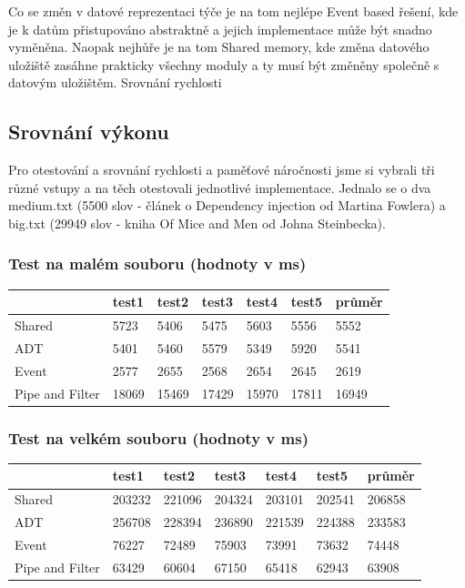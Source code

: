 \documentclass[11pt]{article}
\begin{document}
Co se změn v datové reprezentaci týče je na tom nejlépe Event based řešení, kde je k datům přistupováno abstraktně a jejich implementace může být snadno vyměněna. Naopak nejhůře je na tom  Shared memory, kde změna datového uložiště zasáhne prakticky všechny moduly a ty musí být změněny společně s datovým uložištěm.
Srovnání rychlosti

\subsection{Srovnání výkonu}

Pro otestování a srovnání rychlosti a paměťové náročnosti jsme si vybrali tři různé vstupy a na těch otestovali jednotlivé implementace. Jednalo se o dva medium.txt (5500 slov - článek o Dependency injection od Martina Fowlera) a big.txt (29949 slov - kniha Of Mice and Men od Johna Steinbecka).

\subsubsection{Test na malém souboru (hodnoty v ms)}

\begin{tabular}{|l||l|l|l|l|l|l|}
\hline
  {\bf }  & {\bf test1} & {\bf test2} & {\bf test3} & {\bf test4} & {\bf test5} & {\bf průměr}  \\
  \hline \hline
  Shared  & 5723& 5406 & 5475 & 5603 & 5556 & 5552  \\
  ADT  & 5401& 5460 & 5579 & 5349 & 5920 & 5541  \\
  Event  & 2577& 2655 & 2568 & 2654 & 2645 & 2619  \\
  Pipe and Filter  & 18069 & 15469 & 17429 & 15970 & 17811 & 16949  \\
\hline
\end{tabular}

\subsubsection{Test na velkém souboru (hodnoty v ms)}

\begin{tabular}{|l||l|l|l|l|l|l|}
\hline
  {\bf }  & {\bf test1} & {\bf test2} & {\bf test3} & {\bf test4} & {\bf test5} & {\bf průměr}  \\
  \hline \hline
  Shared  & 203232& 221096 & 204324 & 203101 & 202541 & 206858  \\
  ADT  & 256708& 228394 & 236890 & 221539 &224388 & 233583  \\
  Event  & 76227& 72489 & 75903 & 73991 & 73632 & 74448  \\
  Pipe and Filter  & 63429 & 60604 & 67150 & 65418 & 62943 & 63908  \\
\hline
\end{tabular}
\end{document}
